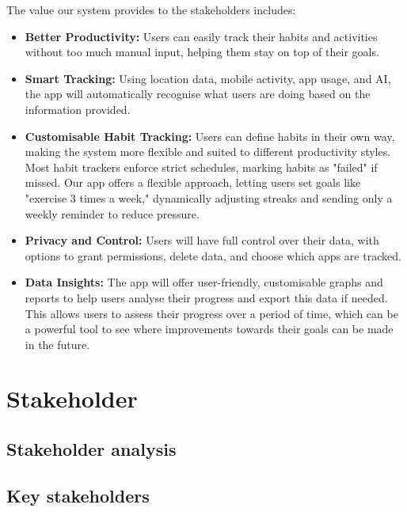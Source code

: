 The value our system provides to the stakeholders includes:

\begin{itemize}
    \item \textbf{Better Productivity:} Users can easily track their habits and activities without too much manual input, helping them stay on top of their goals.
    
    \item \textbf{Smart Tracking:} Using location data, mobile activity, app usage, and AI, the app will automatically recognise what users are doing based on the information provided.

    \item \textbf{Customisable Habit Tracking:} Users can define habits in their own way, making the system more flexible and suited to different productivity styles. Most habit trackers enforce strict schedules, marking habits as "failed" if missed. Our app offers a flexible approach, letting users set goals like "exercise 3 times a week," dynamically adjusting streaks and sending only a weekly reminder to reduce pressure.

    \item \textbf{Privacy and Control:} Users will have full control over their data, with options to grant permissions, delete data, and choose which apps are tracked.

    \item \textbf{Data Insights:} The app will offer user-friendly, customisable graphs and reports to help users analyse their progress and export this data if needed. This allows users to assess their progress over a period of time, which can be a powerful tool to see where improvements towards their goals can be made in the future.
\end{itemize}

\section{Stakeholder}
\label{sect:stakeholder}

\subsection{Stakeholder analysis}



\subsection{Key stakeholders}